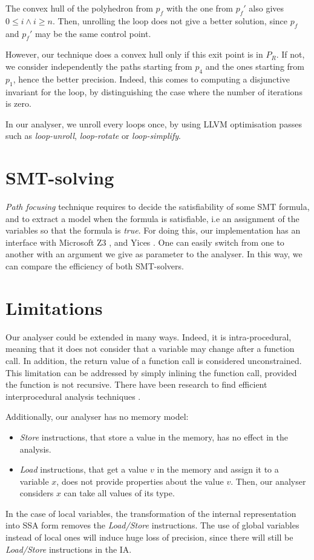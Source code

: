 \documentclass[a4paper,english,titlepage,11pt]{report}
\begin{document}
The convex hull of the polyhedron from $p_f$ with the one from $p_f'$ also gives
$0 \leq i \wedge i \geq n$. Then, unrolling the loop does not give a better
solution, since
$p_f$ and $p_f'$ may be the same control point.

However, our technique does a convex hull only if this exit point is in $P_R$. 
If not, we consider independently the paths starting from $p_4$ and the ones
starting from $p_1$, hence the better precision. Indeed, this comes to computing
a disjunctive invariant for the loop, by distinguishing the case where the
number of iterations is zero. 

In our analyser, we unroll every loops once, by using LLVM optimisation
passes such as \emph{loop-unroll}, \emph{loop-rotate} or \emph{loop-simplify}.


	\section{SMT-solving}

	\emph{Path focusing} technique requires to decide the satisfiability of some
	SMT formula, and to extract a model when the formula is satisfiable, i.e an
	assignment of the variables so that the formula is \emph{true}. For doing
	this, our implementation has an interface with Microsoft Z3 \cite{MouraB08},
	and Yices \cite{DutertreM06}. One can easily switch from one to another with
	an argument we give as parameter to the analyser. In this way, we can
	compare the efficiency of both SMT-solvers.

	\section{Limitations}

	Our analyser could be extended in many ways. Indeed, it is intra-procedural,
	meaning that it does not consider that a variable may change after a
	function call. In addition, the return value of a function call is
	considered unconstrained. This limitation can be addressed by simply
	inlining the function call, provided the function is not recursive.
	There have been research to find efficient interprocedural analysis
	techniques \cite{Bourdoncle90,Bou92,jeannet09b}.

	Additionally, our analyser has no memory model:
\begin{itemize}
\item \emph{Store} instructions, that store a value in the memory, has no effect
in the analysis.
\item \emph{Load} instructions, that get a value $v$ in the memory and assign it
to a variable $x$, does not provide properties about the value $v$. Then, our
analyser considers $x$ can take all values of its type.
\end{itemize}
In the case of local variables, the transformation of the internal
representation into SSA form removes the \emph{Load/Store} instructions.
The use of global variables instead of local ones will induce huge
loss of precision, since there will still be \emph{Load/Store} instructions in
the IA.
\end{document}
